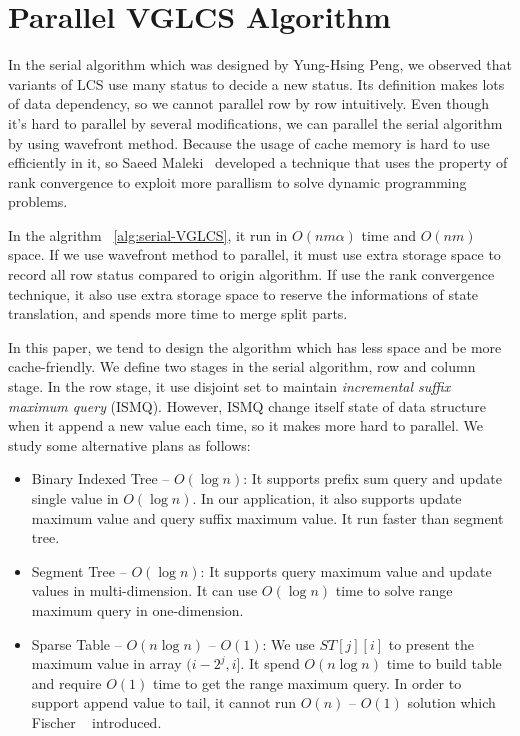 \section{Parallel VGLCS Algorithm} %
\label{sec:parallelSerial}

In the serial algorithm which was designed by Yung-Hsing Peng, we
observed that variants of LCS use many status to decide a new status.
Its definition makes lots of data dependency, so we cannot parallel
row by row intuitively.  Even though it's hard to parallel by several
modifications, we can parallel the serial algorithm by using wavefront
method.  Because the usage of cache  memory is hard to use efficiently
in it, so Saeed Maleki~\cite{saeed} developed a technique that uses
the property of rank convergence to exploit more parallism to solve
dynamic programming problems.



In the algrithm ~\ref{alg:serial-VGLCS}, it run in $O(nm \alpha)$ time
and $O(nm)$ space.  If we use wavefront method to parallel, it must
use extra storage space to record all row status compared to origin
algorithm.  If use the rank convergence technique, it also use extra
storage space to reserve the informations of state translation, and
spends more time to merge split parts.

In this paper, we tend to design the algorithm which has less space
and be more cache-friendly.  We define two stages in the serial
algorithm, row and column stage.  In the row stage, it use disjoint
set to maintain \emph{incremental suffix maximum query} (ISMQ).
However, ISMQ change itself state of data structure when it append a
new value each time, so it makes more hard to parallel.  We study some
alternative plans as follows:

\begin{itemize}
  \item 

Binary Indexed Tree -- $O(\log n)$: It supports prefix sum query and
update single value in $O(\log n)$.  In our application, it also
supports update maximum value and query suffix maximum value.  It run
faster than segment tree.

  \item 

Segment Tree -- $O(\log n)$: It supports query maximum value and
update values in multi-dimension.  It can use $O(\log n)$ time to
solve range maximum query in one-dimension.

  \item 

Sparse Table -- $O(n \log n)$ -- $O(1)$: We use $ST[j][i]$ to present
the maximum value in array $(i-2^j,i]$.  It spend $O(n \log n)$ time
to build table and require $O(1)$ time to get the range maximum query.
In order to support append value to tail, it cannot run $O(n)$ --
$O(1)$ solution which Fischer ~\cite{fischer} introduced.

\end{itemize}

